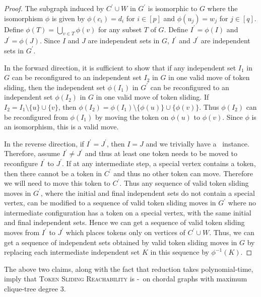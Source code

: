 \begin{proof}
The subgraph induced by $C^\prime \cup W$ in $G^\prime$ 
is isomorphic to $G$ where the isomorphism $\phi$ is given by 
$\phi(c_i)=d_i$ for $i\in [p]$ and $\phi(u_j)=w_j$ for $j \in [q]$.
Define $\phi(T)=\bigcup_{v\in T}{\phi(v)}$ for any subset $T$ of $G$. 
Define $I^\prime=\phi(I)$ and $J^\prime=\phi(J)$. 
Since $I$ and $J$ are independent sets in $G$, $I^\prime$ and $J^\prime$ are independent sets in $G^\prime$.

In the forward direction,
it is sufficient to show that if any independent set $I_1$ in $G$ 
can be reconfigured to an independent set $I_2$ in $G$ in 
one valid move of token sliding, then the independent set 
$\phi(I_1)$ in $G^\prime$ can be reconfigured to an 
independent set $\phi(I_2)$ in $G$ in one valid move of token sliding.
If $I_2=I_1\setminus \{u\}\cup \{v\}$, then $\phi(I_2)=\phi(I_1)\setminus \{\phi(u)\}\cup \{\phi(v)\}$. 
Thus $\phi(I_2)$ can be reconfigured from $\phi(I_1)$ by moving 
the token on $\phi(u)$ to $\phi(v)$. 
Since $\phi$ is an isomorphism, this is a valid move.

In the reverse direction, if $I^\prime=J^\prime$, 
then $I=J$ and we trivially have a \yes\ instance.
Therefore, assume $I^\prime \neq J^\prime$ and thus at least 
one token needs to be moved to reconfigure $I^\prime$ to $J^\prime$.
If at any intermediate step, a special vertex contains a token, 
then there cannot be a token in $C^\prime$ and thus no other 
token can move. 
Therefore we will need to move this token to $C^\prime$. 
Thus any sequence of valid token sliding moves in $G^\prime$, 
where the initial and final independent sets do not contain 
a special vertex, can be modified to a sequence of valid token 
sliding moves in $G^\prime$ where no intermediate configuration 
has a token on a special vertex, with the same initial and final independent 
sets.
Hence we can get a sequence of valid token sliding moves from $I^\prime$ 
to $J^\prime$ which places tokens only on vertices of $C^\prime \cup W$. 
Thus, we can get a sequence of independent sets obtained by valid token
sliding moves in $G$ by replacing each intermediate independent set 
$K$ in this sequence by $\phi^{-1}(K)$.
\end{proof}



The above two claims, along with the fact that reduction takes polynomial-time,
imply that \textsc{Token Sliding Reachability} is \NP-\hard\ on chordal graphs with maximum clique-tree degree $3$.



